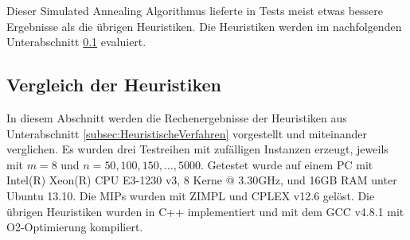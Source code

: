 \documentclass{scrreprt}
\begin{document}
Dieser Simulated Annealing Algorithmus lieferte in Tests meist etwas bessere Ergebnisse als die übrigen Heuristiken.
Die Heuristiken werden im nachfolgenden Unterabschnitt \ref{subsec:VergleichDerHeuristiken} evaluiert.


\subsection{Vergleich der Heuristiken}
\label{subsec:VergleichDerHeuristiken}
In diesem Abschnitt werden die Rechenergebnisse der Heuristiken aus Unterabschnitt \ref{subsec:HeuristischeVerfahren} vorgestellt und miteinander verglichen.
Es wurden drei Testreihen mit zufälligen Instanzen erzeugt, jeweils mit $m=8$ und $n=50,100,150,\ldots,5000$.
Getestet wurde auf einem PC mit Intel(R) Xeon(R) CPU E3-1230 v3, 8 Kerne @ 3.30GHz, und 16GB RAM unter Ubuntu 13.10.
Die MIPs wurden mit ZIMPL \cite{Koch2004} und CPLEX v12.6 gelöst.
Die übrigen Heuristiken wurden in C++ implementiert und mit dem GCC v4.8.1 mit O2-Optimierung kompiliert.
\end{document}
